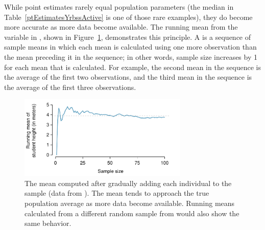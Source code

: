 \begin{spacing}{1.5}
While point estimates rarely equal population parameters (the median in Table~\ref{ptEstimatesYrbssActive} is one of those rare examples), they do become more accurate as more data become available. The running mean from the variable  in , shown in Figure~\ref{yrbssActiveRunningMean}, demonstrates this principle. A  is a sequence of sample means in which each mean is calculated using one more observation than the mean preceding it in the sequence; in other words, sample size increases by 1 for each mean that is calculated. For example, the second mean in the sequence is the average of the first two observations, and the third mean in the sequence is the average of the first three observations. 

\begin{figure}[h]
   \centering
   \includegraphics[width=0.72\textwidth]{ch_inference_foundations_oi_biostat/figures/yrbssActiveRunningMean/yrbssActiveRunningMean}
   \caption{The mean computed after gradually adding each individual to the sample (data from ). The mean tends to approach the true population average as more data become available. Running means calculated from a different random sample from  would also show the same behavior.}
   \label{yrbssActiveRunningMean}
\end{figure}

\end{spacing}
